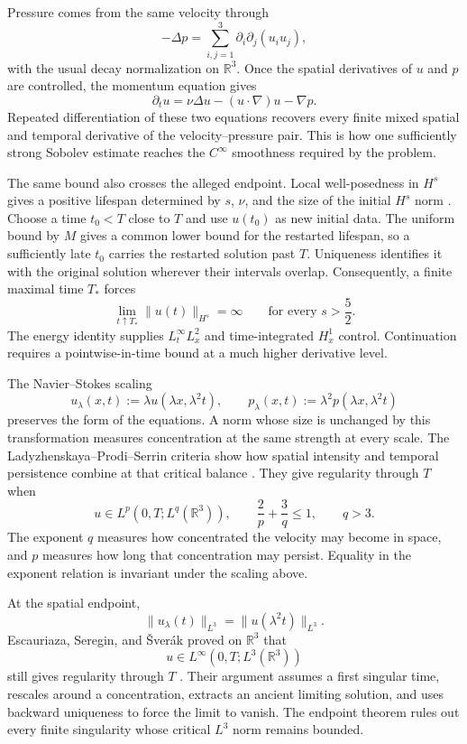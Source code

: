Pressure comes from the same velocity through
\[
  -\Delta p
  =
  \sum_{i,j=1}^{3}
  \partial_i\partial_j(u_i u_j),
\]
with the usual decay normalization on \(\mathbb R^3\).
Once the spatial derivatives of \(u\) and \(p\) are controlled, the momentum equation gives
\[
  \partial_tu
  =
  \nu\Delta u-(u\cdot\nabla)u-\nabla p.
\]
Repeated differentiation of these two equations recovers every finite mixed spatial and temporal derivative of the velocity--pressure pair.
This is how one sufficiently strong Sobolev estimate reaches the \(C^\infty\) smoothness required by the problem.

The same bound also crosses the alleged endpoint.
Local well-posedness in \(H^s\) gives a positive lifespan determined by \(s\), \(\nu\), and the size of the initial \(H^s\) norm \parencite{FujitaKato1964,Kato1984}.
Choose a time \(t_0<T\) close to \(T\) and use \(u(t_0)\) as new initial data.
The uniform bound by \(M\) gives a common lower bound for the restarted lifespan, so a sufficiently late \(t_0\) carries the restarted solution past \(T\).
Uniqueness identifies it with the original solution wherever their intervals overlap.
Consequently, a finite maximal time \(T_*\) forces
\[
  \lim_{t\uparrow T_*}
  \lVert u(t)\rVert_{H^s}
  =
  \infty
  \qquad
  \text{for every }s>\frac52.
\]
The energy identity supplies \(L^\infty_tL^2_x\) and time-integrated \(H^1_x\) control.
Continuation requires a pointwise-in-time bound at a much higher derivative level.


The Navier--Stokes scaling
\[
  u_\lambda(x,t)
  :=
  \lambda u(\lambda x,\lambda^2t),
  \qquad
  p_\lambda(x,t)
  :=
  \lambda^2p(\lambda x,\lambda^2t)
\]
preserves the form of the equations.
A norm whose size is unchanged by this transformation measures concentration at the same strength at every scale.
The Ladyzhenskaya--Prodi--Serrin criteria show how spatial intensity and temporal persistence combine at that critical balance \parencite{Prodi1959,Serrin1962,Serrin1963,Ladyzhenskaya1967}.
They give regularity through \(T\) when
\[
  u\in L^p(0,T;L^q(\mathbb R^3)),
  \qquad
  \frac{2}{p}+\frac{3}{q}\leq1,
  \qquad
  q>3.
\]
The exponent \(q\) measures how concentrated the velocity may become in space, and \(p\) measures how long that concentration may persist.
Equality in the exponent relation is invariant under the scaling above.

At the spatial endpoint,
\[
  \lVert u_\lambda(t)\rVert_{L^3}
  =
  \lVert u(\lambda^2t)\rVert_{L^3}.
\]
Escauriaza, Seregin, and \v{S}ver{\'a}k proved on \(\mathbb R^3\) that
\[
  u\in L^\infty(0,T;L^3(\mathbb R^3))
\]
still gives regularity through \(T\) \parencite{EscauriazaSereginSverak2003}.
Their argument assumes a first singular time, rescales around a concentration, extracts an ancient limiting solution, and uses backward uniqueness to force the limit to vanish.
The endpoint theorem rules out every finite singularity whose critical \(L^3\) norm remains bounded.

